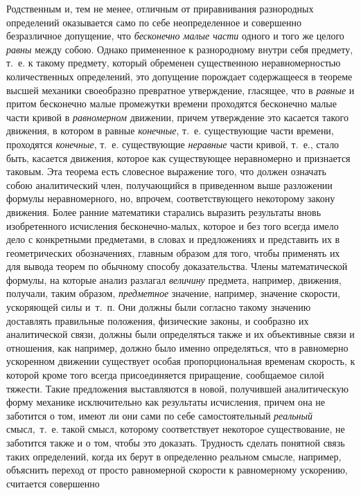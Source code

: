 {Родственным и, тем не менее, отличным от приравнивания разнородных
определений оказывается само по себе неопределенное и совершенно
безразличное допущение, что {\em бесконечно малые
части} одного и того же целого {\em равны} между собою.
Однако примененное к разнородному внутри себя предмету, т.~е. к такому
предмету, который обременен существенною неравномерностью количественных
определений, это допущение порождает содержащееся в теореме высшей механики
своеобразно превратное утверждение, гласящее, что в
{\em равные} и притом бесконечно малые промежутки
времени проходятся бесконечно малые части кривой в
{\em равномерном} движении, причем утверждение это
касается такого движения, в котором в равные
{\em конечные}, т.~е. существующие части времени,
проходятся {\em конечные}, т.~е. существующие
{\em неравные} части кривой, т.~е., стало быть,
касается движения, которое как существующее неравномерно и признается
таковым. Эта теорема есть словесное выражение того, что должен означать
собою аналитический член, получающийся в приведенном выше разложении
формулы неравномерного, но, впрочем, соответствующего некоторому закону
движения. Более ранние математики старались выразить результаты вновь
изобретенного исчисления бесконечно-малых, которое и без того всегда имело
дело с конкретными предметами, в словах и предложениях и представить их в
геометрических обозначениях, главным образом для того, чтобы применять их
для вывода теорем по обычному способу доказательства. Члены математической
формулы, на которые анализ разлагал {\em величину}
предмета, например, движения, получали, таким образом,
{\em предметное} значение, например, значение скорости,
ускоряющей силы и~т.~п. Они должны были согласно такому значению доставлять
правильные положения, физические законы, и сообразно их аналитической
связи, должны были определяться также и их объективные связи и отношения,
как например, должно было именно определяться, что в равномерно ускоренном
движении существует особая пропорциональная временам скорость, к которой
кроме того всегда присоединяется приращение, сообщаемое силой тяжести.
Такие предложения выставляются в новой, получившей аналитическую форму
механике исключительно как результаты исчисления, причем она не заботится о
том, имеют ли они сами по себе самостоятельный
{\em реальный} смысл,~т.~е. такой смысл, которому
соответствует некоторое существование, не заботится также и о том, чтобы
это доказать. Трудность сделать понятной связь таких определений, когда их
берут в определенно реальном смысле, например, объяснить переход от просто
равномерной скорости к равномерному ускорению, считается совершенно
}
